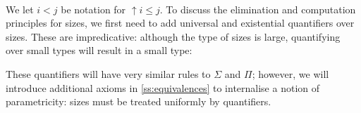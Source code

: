 \begin{center}
    \begin{bprooftree}
    \end{bprooftree}
    \begin{bprooftree}
    \end{bprooftree}\quad
    \begin{bprooftree}
    \end{bprooftree} \\[2ex]
    \begin{bprooftree}
    \end{bprooftree}\quad
    \begin{bprooftree}
    \end{bprooftree}
\end{center}
We let $i < j$ be notation for $\uparrow \!i \le j$. 
To discuss the elimination and computation principles for sizes, we first need to add universal and existential quantifiers over sizes.
These are impredicative: although the type of sizes is large, quantifying over small types will result in a small type:
\begin{center}
    \begin{bprooftree}
    \end{bprooftree}\quad\begin{bprooftree}
    \end{bprooftree}
\end{center}
These quantifiers will have very similar rules to \(\Sigma\) and \(\Pi\); however, we will introduce additional axioms in \autoref{ss:equivalences} to internalise a notion of parametricity: sizes must be treated uniformly by quantifiers.
